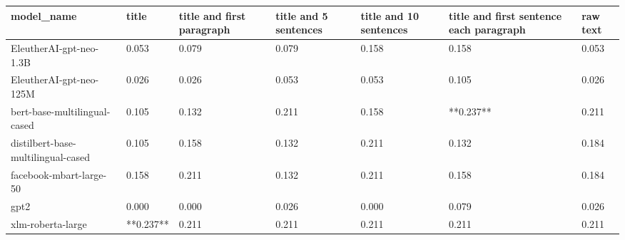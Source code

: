\begin{tabular}{lllllll}
\toprule
                        model\_name &     title & title and first paragraph & title and 5 sentences & title and 10 sentences & title and first sentence each paragraph & raw text \\
\midrule
           EleutherAI-gpt-neo-1.3B &     0.053 &                     0.079 &                 0.079 &                  0.158 &                                   0.158 &    0.053 \\
           EleutherAI-gpt-neo-125M &     0.026 &                     0.026 &                 0.053 &                  0.053 &                                   0.105 &    0.026 \\
      bert-base-multilingual-cased &     0.105 &                     0.132 &                 0.211 &                  0.158 &                               **0.237** &    0.211 \\
distilbert-base-multilingual-cased &     0.105 &                     0.158 &                 0.132 &                  0.211 &                                   0.132 &    0.184 \\
           facebook-mbart-large-50 &     0.158 &                     0.211 &                 0.132 &                  0.211 &                                   0.158 &    0.184 \\
                              gpt2 &     0.000 &                     0.000 &                 0.026 &                  0.000 &                                   0.079 &    0.026 \\
                 xlm-roberta-large & **0.237** &                     0.211 &                 0.211 &                  0.211 &                                   0.211 &    0.211 \\
\bottomrule
\end{tabular}
